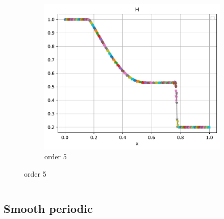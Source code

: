 \documentclass[pt12]{beamer}
\begin{document}
\begin{frame}
\begin{columns}
\begin{column}{0.60\textwidth}
\begin{figure}
\begin{subfigure}[b]{0.40\textwidth}
     \end{subfigure}
     \begin{subfigure}[b]{0.40\textwidth}
         \centering
         \includegraphics[width=\textwidth]{figures/sod/o5.pdf}
         \caption{order 5}
     \end{subfigure}
\end{figure}

		\end{column}

	\end{columns}

\end{frame}

\subsection{Smooth periodic}
\end{document}
